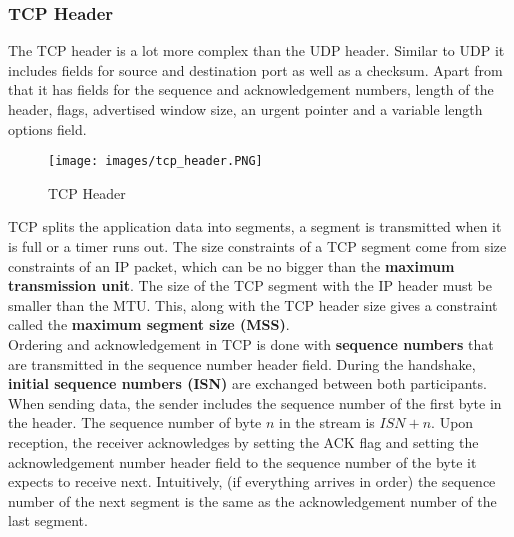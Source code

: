 \subsubsection{TCP Header}
The TCP header is a lot more complex than the UDP header. Similar to UDP it includes fields for source and destination port as well as a checksum. Apart from that it has fields for the sequence and acknowledgement numbers, length of the header, flags, advertised window size, an urgent pointer and a variable length options field.
\begin{figure}[H]
\centering
\texttt{[image: images/tcp\_header.PNG]}
\caption{TCP Header}
\label{tcp_header}
\end{figure}
TCP splits the application data into segments, a segment is transmitted when it is full or a timer runs out. The size constraints of a TCP segment come from size constraints of an IP packet, which can be no bigger than the \textbf{maximum transmission unit}. The size of the TCP segment with the IP header must be smaller than the MTU. This, along with the TCP header size gives a constraint called the \textbf{maximum segment size (MSS)}.\vspace{.3cm}\\

Ordering and acknowledgement in TCP is done with \textbf{sequence numbers} that are transmitted in the sequence number header field. During the handshake, \textbf{initial sequence numbers (ISN)} are exchanged between both participants. When sending data, the sender includes the sequence number of the first byte in the header. The sequence number of byte $n$ in the stream is $ISN + n$. Upon reception, the receiver acknowledges by setting the ACK flag and setting the acknowledgement number header field to the sequence number of the byte it expects to receive next. Intuitively, (if everything arrives in order) the sequence number of the next segment is the same as the acknowledgement number of the last segment.\vspace{.3cm}\\

